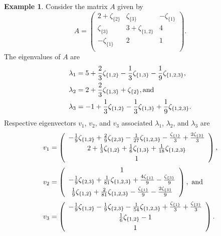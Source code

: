 \documentclass{article}
\theoremstyle{definition}
\newtheorem{example}[theorem]{Example}
\numberwithin{equation}{section}
\begin{document}
\begin{example}
Consider the matrix $A$ given by \begin{equation*}
A=\left(
\begin{array}{ccc}
 2+\zeta _{\{2\}} & \zeta _{\{3\}} & -\zeta _{\{1\}} \\
 \zeta _{\{3\}} & 3+\zeta _{\{1,2\}} & 4 \\
 -\zeta _{\{1\}} & 2 & 1 \\
\end{array}
\right).
\end{equation*}
The eigenvalues of $A$ are \begin{align*}
\lambda_1&=5+\frac{2}{3} \zeta _{\{1,2\}}-\frac{1}{3} \zeta _{\{1,3\}}-\frac{1}{9} \zeta _{\{1,2,3\}},\\
\lambda_2&=2+\frac{2}{3} \zeta _{\{1,3\}}+\zeta _{\{2\}}, { \rm and}\\
\lambda_3&=-1+\frac{1}{3} \zeta _{\{1,2\}}-\frac{1}{3} \zeta _{\{1,3\}}+\frac{1}{9} \zeta _{\{1,2,3\}}.
\end{align*}
Respective eigenvectors $v_1$, $v_2$, and $v_3$ associated $\lambda_1$, $\lambda_2$, and $\lambda_3$ are 
 \begin{align*}
 v_1&=\left(
\begin{array}{c}
 -\frac{1}{9} \zeta _{\{1,2\}}+\frac{2}{9} \zeta _{\{2,3\}}-\frac{1}{27} \zeta _{\{1,2,3\}}-\frac{\zeta _{\{1\}}}{3}+\frac{2 \zeta _{\{3\}}}{3} \vspace{3pt}\\
 2+\frac{1}{3} \zeta _{\{1,2\}}+\frac{1}{6} \zeta _{\{1,3\}}+\frac{1}{18} \zeta _{\{1,2,3\}}\vspace{3pt}\\
 1 \\
\end{array}
\right),\\
v_2&=\left(
\begin{array}{c}
 1 \\
 -\frac{1}{9} \zeta _{\{2,3\}}+\frac{1}{81} \zeta _{\{1,2,3\}}+\frac{4 \zeta _{\{1\}}}{9}-\frac{\zeta _{\{3\}}}{9}\vspace{3pt} \\
 \frac{1}{9} \zeta _{\{1,2\}}+\frac{2}{81} \zeta _{\{1,2,3\}}-\frac{\zeta _{\{1\}}}{9}-\frac{2 \zeta _{\{3\}}}{9}\vspace{3pt} \\
\end{array}
\right),\text{ \rm and}\\
v_3&=\left(
\begin{array}{c}
 -\frac{1}{9} \zeta _{\{1,2\}}-\frac{1}{9} \zeta _{\{2,3\}}-\frac{1}{54} \zeta _{\{1,2,3\}}+\frac{\zeta _{\{1\}}}{3}+\frac{\zeta _{\{3\}}}{3} \vspace{3pt}\\
 \frac{1}{6} \zeta _{\{1,2\}}-1 \vspace{3pt}\\
 1 \\
\end{array}
\right). 
\end{align*}
\end{example}
\end{document}
